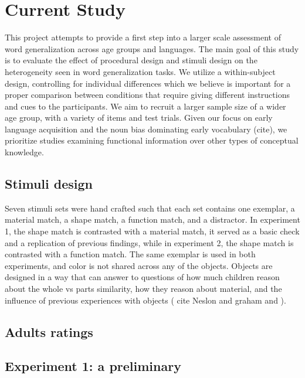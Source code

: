 \documentclass[10pt, letterpaper]{article}
\begin{document}
\hypertarget{current-study}{%
\section{Current Study}\label{current-study}}

This project attempts to provide a first step into a larger scale
assessment of word generalization across age groups and languages. The
main goal of this study is to evaluate the effect of procedural design
and stimuli design on the heterogeneity seen in word generalization
tasks. We utilize a within-subject design, controlling for individual
differences which we believe is important for a proper comparison
between conditions that require giving different instructions and cues
to the participants. We aim to recruit a larger sample size of a wider
age group, with a variety of items and test trials. Given our focus on
early language acquisition and the noun bias dominating early vocabulary
(cite), we prioritize studies examining functional information over
other types of conceptual knowledge.

\hypertarget{stimuli-design}{%
\subsection{Stimuli design}\label{stimuli-design}}

Seven stimuli sets were hand crafted such that each set contains one
exemplar, a material match, a shape match, a function match, and a
distractor. In experiment 1, the shape match is contrasted with a
material match, it served as a basic check and a replication of previous
findings, while in experiment 2, the shape match is contrasted with a
function match. The same exemplar is used in both experiments, and color
is not shared across any of the objects. Objects are designed in a way
that can answer to questions of how much children reason about the whole
vs parts similarity, how they reason about material, and the influence
of previous experiences with objects ( cite Neslon and graham and ).

\hypertarget{adults-ratings}{%
\subsection{Adults ratings}\label{adults-ratings}}

\hypertarget{experiment-1-a-preliminary}{%
\subsection{Experiment 1: a
preliminary}\label{experiment-1-a-preliminary}}
\end{document}
